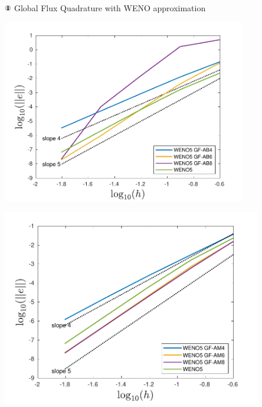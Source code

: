 \begin{frame}[t]{\includegraphics[width=0.3cm]{circle1} Global Flux Quadrature  with WENO approximation}
{	
	\begin{minipage}{0.5\textwidth}
		\centering\includegraphics[width=0.8\textwidth]{../figs/WENO-FD/figures/Burgers/MMS/weno5_AB_MMS_conv} 
	\end{minipage}\hfill
	\begin{minipage}{0.5\textwidth}
		\centering\includegraphics[width=0.85\textwidth]{../figs/WENO-FD/figures/Burgers/MMS/weno5_AM_MMS_conv} 
	\end{minipage}
}


\end{frame}
